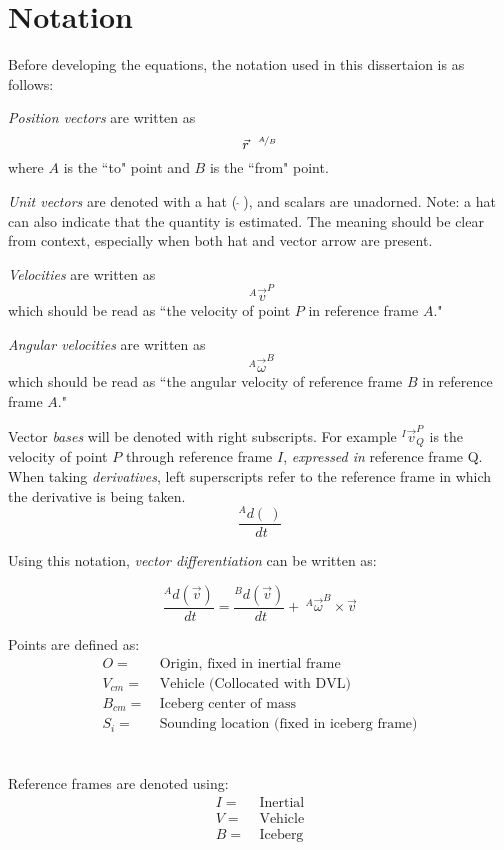 \section{Notation}

Before developing the equations, the notation used in this dissertaion is as follows:

\emph{Position vectors} are written as
\begin{equation*}
 \vec{r}^{~~\nicefrac{A}{B}} 
\end{equation*}
where $A$ is the ``to" point and $B$ is the ``from" point.

\emph{Unit vectors} are denoted with a hat ($~\hat{}~$), and scalars are unadorned. Note: a hat can also indicate that the quantity is estimated. The meaning should be clear from context, especially when both hat and vector arrow are present.

\emph{Velocities} are written as 
\begin{equation*} 
~^{A}\vec{v}^{P} 
\end{equation*}
which should be read as ``the velocity of point $P$ in reference frame $A$."

\emph{Angular velocities} are written as 
\begin{equation*}
 ~^{A}\vec{\omega}^{B}
\end{equation*}
which should be read as ``the angular velocity of reference frame $B$ in reference frame $A$."

Vector \emph{bases} will be denoted with right subscripts. For example $^I\vec{v}^P_{Q}$ is the velocity of point $P$ through reference frame $I$, \emph{expressed in} reference frame Q.   
When taking \emph{derivatives}, left superscripts refer to the reference frame in which the derivative is being taken.
\begin{equation*}
 \frac{^{A}d(~)}{~dt}
\end{equation*}

Using this notation, \emph{vector differentiation} can be written as:

\begin{equation*}
 \frac{^{A}d(\vec{v})}{~dt} = \frac{^{B}d(\vec{v})}{~dt} + ~^{A}\vec{\omega}^{B}\times \vec{v}
\end{equation*}

Points are defined as:
\begin{align*}
O =&~ \text{Origin, fixed in inertial frame}\\
V_{cm} =&~ \text{Vehicle (Collocated with DVL)} \\
B_{cm} =&~ \text{Iceberg center of mass}\\
S_i =&~ \text{Sounding location (fixed in iceberg frame)}
\end{align*}
\\
\\
Reference frames are denoted using:
\begin{align*}
I =&~ \text{Inertial}\\
V =&~ \text{Vehicle} \\
B =&~ \text{Iceberg}
\end{align*}

